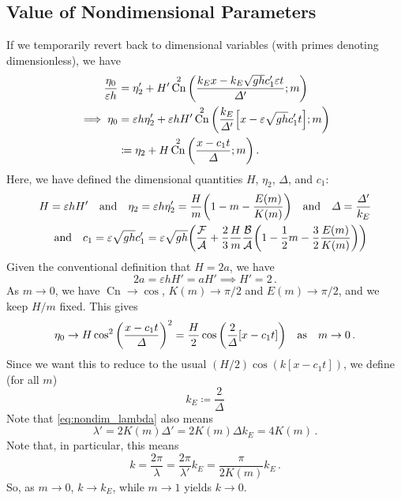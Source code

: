 \documentclass{jfm}
\DeclareMathOperator{\cn}{Cn}
\renewcommand*{\epsilon}{\varepsilon}
\begin{document}
\subsection{Value of Nondimensional Parameters}
If we temporarily revert back to dimensional variables (with primes
denoting dimensionless), we have
\begin{equation}
  \begin{split}
  \frac{\eta_0}{\epsilon h} &= \eta_2' + H' \cn^2\pqty{\frac{k_E x - k_E
    \sqrt{gh} c_1' \epsilon t}{\Delta'}; m}
  \\
  \implies
  \eta_0 &= \epsilon h \eta_2' + \epsilon h H'
  \cn^2\pqty{\frac{k_E}{\Delta'} \bqty{x - \epsilon \sqrt{gh} c_1' t}; m}
  \\
  &\coloneqq \eta_2 + H \cn^2\pqty{\frac{x - c_1 t}{\Delta}; m} \,.
  \end{split}
\end{equation}
Here, we have defined the dimensional quantities $H$, $\eta_2$,
$\Delta$, and $c_1$:
\begin{gather}
  H = \epsilon h H'
  \qq{and}
  \eta_2 = \epsilon h \eta_2' = \frac{H}{m} \pqty{1 - m - \frac{E(m)}{K(m)}}
  \qq{and}
  \Delta = \frac{\Delta'}{k_E}
  \\
  \qq{and}
  c_1 = \epsilon \sqrt{gh} c_1' = \epsilon \sqrt{gh} \pqty{
    \frac{\mathcal{F}}{\mathcal{A}} + \frac{2}{3} \frac{H}{m}
    \frac{\mathcal{B}}{\mathcal{A}} \pqty{1 - \frac{1}{2} m - \frac{3}{2}
    \frac{E(m)}{K(m)}} }
\end{gather}
Given the conventional definition that $H = 2 a$, we have
\begin{equation}
  2 a = \epsilon h H' = a H' \implies H' = 2 \,.
\end{equation}
As $m \to 0$, we have $\cn \to \cos$, $K(m) \to \pi/2$ and $E(m) \to
\pi/2$, and we keep $H/m$ fixed.
This gives
\begin{equation}
  \eta_0 \to H \cos^2 \pqty{\frac{x-c_1 t}{\Delta}}^2
  = \frac{H}{2} \cos \pqty{\frac{2}{\Delta} \bqty{x-c_1 t}}
  \qq{as} m \to 0 \,.
\end{equation}
Since we want this to reduce to the usual $(H/2) \cos(k[x-c_1 t])$, we
define (for all $m$)
\begin{equation}
  k_E \coloneqq \frac{2}{\Delta}
\end{equation}
Note that \cref{eq:nondim_lambda} also means
\begin{equation}
  \lambda' = 2 K(m) \Delta' = 2 K(m) \Delta k_E = 4 K(m) \,.
\end{equation}
Note that, in particular, this means
\begin{equation}
  k = \frac{2 \pi}{\lambda} = \frac{2 \pi}{\lambda'} k_E
  = \frac{\pi}{2 K(m)} k_E \,.
\end{equation}
So, as $m \to 0$, $k \to k_E$, while $m \to 1$ yields $k \to 0$.
\end{document}
